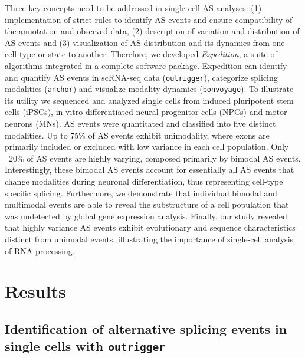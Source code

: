 Three key concepts need to be addressed in single-cell AS analyses: (1) implementation of strict rules to identify AS events and ensure compatibility of the annotation and observed data, (2) description of variation and distribution of AS events and (3) visualization of AS distribution and its dynamics from one cell-type or state to another. Therefore, we developed \emph{Expedition}, a suite of algorithms integrated in a complete software package. Expedition can identify and quantify AS events in scRNA-seq data (\texttt{outrigger}), categorize splicing modalities (\texttt{anchor}) and visualize modality dynamics (\texttt{bonvoyage}). To illustrate its utility we sequenced and analyzed single cells from induced pluripotent stem cells (iPSCs), in vitro differentiated neural progenitor cells (NPCs) and motor neurons (MNs). AS events were quantitated and classified into five distinct modalities. Up to 75\% of AS events exhibit unimodality, where exons are primarily included or excluded with low variance in each cell population. Only ~20\% of AS events are highly varying, composed primarily by bimodal AS events. Interestingly, these bimodal AS events account for essentially all AS events that change modalities during neuronal differentiation, thus representing cell-type specific splicing. Furthermore, we demonstrate that individual bimodal and multimodal events are able to reveal the substructure of a cell population that was undetected by global gene expression analysis. Finally, our study revealed that highly variance AS events exhibit evolutionary and sequence characteristics distinct from unimodal events, illustrating the importance of single-cell analysis of RNA processing.

\section{Results}
\subsection{Identification of alternative splicing events in single cells with \texttt{\texttt{outrigger}}}

